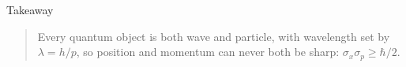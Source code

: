 \documentclass[
  ignorenonframetext,
  aspectratio=169,
  handout]{beamer}
\begin{document}
\begin{frame}{Takeaway}
\protect{}\label{takeaway}
\begin{quote}
Every quantum object is both wave and particle, with wavelength set by
\(\lambda = h/p\), so position and momentum can never both be sharp:
\(\sigma_x \sigma_p \geq \hbar/2\).
\end{quote}
\end{frame}
\end{document}
